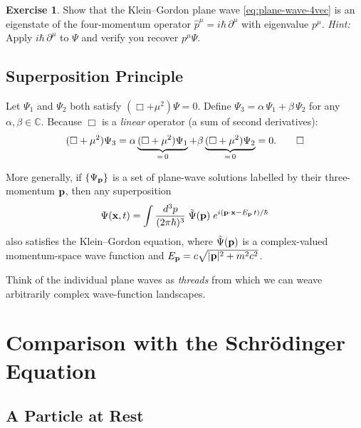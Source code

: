 \documentclass[12pt, a4paper]{article}
\theoremstyle{definition}
\newtheorem{exercise}{Exercise}[section]
\begin{document}
\begin{exercise}
Show that the Klein--Gordon plane wave \eqref{eq:plane-wave-4vec} is an
eigenstate of the four-momentum operator
$\hat{p}^{\mu} = i\hbar\,\partial^{\mu}$ with eigenvalue $p^{\mu}$.
\emph{Hint:} Apply $i\hbar\,\partial^{\mu}$ to $\Psi$ and verify you recover
$p^{\mu}\Psi$.
\end{exercise}

\subsection{Superposition Principle}

\begin{derivation}
Let $\Psi_{1}$ and $\Psi_{2}$ both satisfy $(\Box+\mu^{2})\Psi = 0$.
Define $\Psi_{3} = \alpha\,\Psi_{1} + \beta\,\Psi_{2}$ for any
$\alpha,\beta\in\mathbb{C}$.  Because $\Box$ is a \emph{linear} operator
(a sum of second derivatives):
\[
    (\Box+\mu^{2})\Psi_{3}
    = \alpha\underbrace{(\Box+\mu^{2})\Psi_{1}}_{=\,0}
    + \beta\underbrace{(\Box+\mu^{2})\Psi_{2}}_{=\,0}
    = 0. \qed
\]
\end{derivation}

More generally, if $\{\Psi_{\vb{p}}\}$ is a set of plane-wave solutions
labelled by their three-momentum $\vb{p}$, then any superposition
\begin{equation}\label{eq:general-superposition}
    \Psi(\vb{x},t)
    = \int \frac{d^{3}p}{(2\pi\hbar)^{3}}\;
      \tilde{\Psi}(\vb{p})\;
      e^{i(\vb{p}\cdot\vb{x} - E_{\vb{p}}\,t)/\hbar}
\end{equation}
also satisfies the Klein--Gordon equation, where $\tilde{\Psi}(\vb{p})$ is a
complex-valued momentum-space wave function and
$E_{\vb{p}} = c\sqrt{|\vb{p}|^{2}+m^{2}c^{2}}$.

Think of the individual plane waves as \emph{threads} from which we can weave
arbitrarily complex wave-function landscapes.

\section{Comparison with the Schr\"{o}dinger Equation}
\label{sec:comparison}

\subsection{A Particle at Rest}
\end{document}
